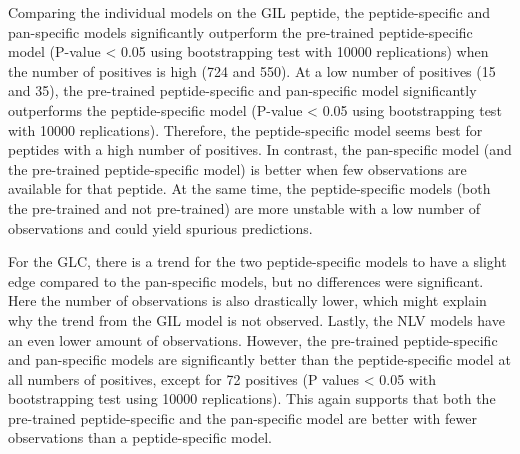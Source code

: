 Comparing the individual models on the GIL peptide, the peptide-specific and pan-specific models significantly outperform the pre-trained peptide-specific model (P-value < 0.05 using bootstrapping test with 10000 replications) when the number of positives is high (724 and 550). At a low number of positives (15 and 35), the pre-trained peptide-specific and pan-specific model significantly outperforms the peptide-specific model (P-value < 0.05 using bootstrapping test with 10000 replications). Therefore, the peptide-specific model seems best for peptides with a high number of positives. In contrast, the pan-specific model (and the pre-trained peptide-specific model) is better when few observations are available for that peptide. At the same time, the peptide-specific models (both the pre-trained and not pre-trained) are more unstable with a low number of observations and could yield spurious predictions. 

For the GLC, there is a trend for the two peptide-specific models to have a slight edge compared to the pan-specific models, but no differences were significant. Here the number of observations is also drastically lower, which might explain why the trend from the GIL model is not observed. Lastly, the NLV models have an even lower amount of observations. However, the pre-trained peptide-specific and pan-specific models are significantly better than the peptide-specific model at all numbers of positives, except for 72 positives (P values < 0.05 with bootstrapping test using 10000 replications). This again supports that both the pre-trained peptide-specific and the pan-specific model are better with fewer observations than a peptide-specific model.

